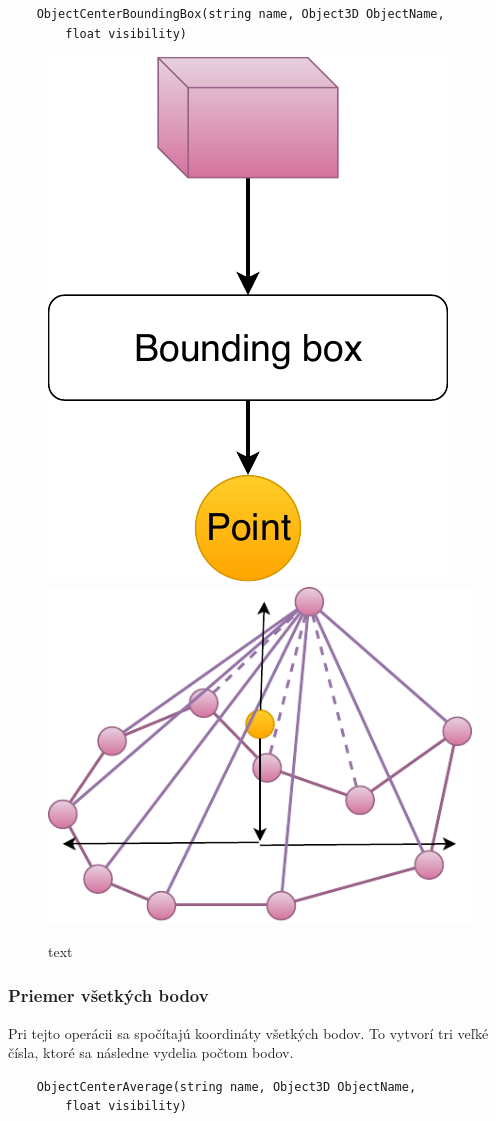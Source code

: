 \begin{lstlisting}
	ObjectCenterBoundingBox(string name, Object3D ObjectName, 
		float visibility)
\end{lstlisting}
		
\begin{figure}[H]
	\centering
	\includegraphics[height=0.3\textwidth]{obrazky-figures/Diagram/Point/DP Navrh operacii-0D - PointMiddle of 3D object.pdf}
	\includegraphics[height=0.3\textwidth]{obrazky-figures/Diagram/Draw/1Points/DP Navrh operacii-0D - PointMiddle of 3D object.pdf}
	\caption{text}
	\label{fig:1}
\end{figure}

\subsubsection{Priemer všetkých bodov} 
Pri tejto operácii sa spočítajú koordináty všetkých bodov. To vytvorí tri veľké čísla, ktoré sa následne vydelia počtom bodov.

\begin{lstlisting}
	ObjectCenterAverage(string name, Object3D ObjectName,
		float visibility)
\end{lstlisting}

